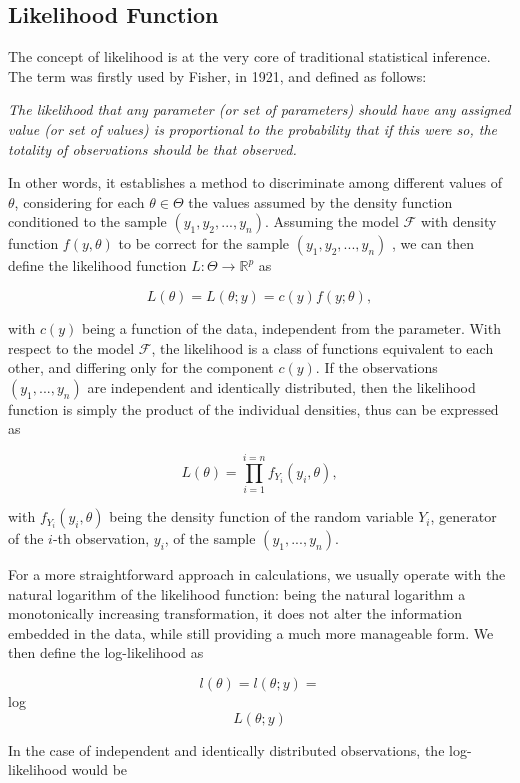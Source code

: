  
\noindent

\subsection{Likelihood Function}
The concept of likelihood is at the very core of traditional statistical inference. The term was firstly used by Fisher, in 1921, and defined as follows:

\bigskip

\textit{The likelihood that any parameter (or set of parameters) should have any assigned value (or set of values) is proportional to the probability that if this were so, the totality of observations should be that observed.} 

\bigskip
In other words, it establishes a method to discriminate among different values of $\theta$, considering for each $\theta \in \Theta$ the values assumed by the density function conditioned to the sample $(y_1,y_2, ... , y_n)$.
Assuming the model $\mathcal{F}$ with density function $f(y,\theta)$ to be correct for the sample $(y_1,y_2, ... , y_n)$ , we can then define the likelihood function $L : \Theta \rightarrow {\mathbb{R}}^p$ as 

$$L(\theta) = L(\theta;y) = c(y)f(y;\theta), $$

with $c(y)$ being a function of the data, independent from the parameter. With respect to the model $\mathcal{F}$, the likelihood is a class of functions equivalent to each other, and differing only for the component $c(y)$. If the observations $(y_1,...,y_n)$ are independent and identically distributed, then the likelihood function  is simply the product of the individual densities, thus can be expressed as

$$L(\theta) = \prod_{i=1}^{i=n} f_{Y_i}(y_i,\theta),$$

with $f_{Y_i}(y_i,\theta)$ being the density function of the random variable $Y_i$, generator of the $i$-th observation, $y_i$, of the sample $(y_1,...,y_n)$.

For a more straightforward approach in calculations, we usually operate with the natural logarithm of the likelihood function: being the natural logarithm a monotonically increasing transformation, it does not alter the information embedded in the data, while still providing a much more manageable form.
We then define the log-likelihood as 

$$l(\theta) = l(\theta; y) =$$ log$$L(\theta; y)$$

In the case of independent and identically distributed observations, the log-likelihood would be

